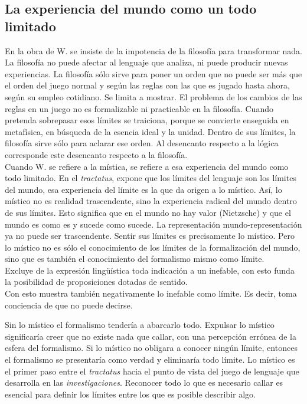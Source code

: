 \documentclass[a4paper, 11pt, twocolumn, spanish]{article}
\begin{document}
\subsection{La experiencia del mundo como un todo limitado}
\label{sec:orgdf86a2f}
En la obra de W. se insiste de la impotencia de la filosofía para
transformar nada. La filosofía no puede afectar al lenguaje que
analiza, ni puede producir nuevas experiencias. La filosofía sólo
sirve para poner un orden que no puede ser más que el orden del juego
normal y según las reglas con las que es jugado hasta ahora, según su
empleo cotidiano. Se limita a mostrar. El problema de los cambios de
las reglas en un juego no es formalizable ni practicable en la
filosofía. Cuando pretenda sobrepasar esos límites se traiciona,
porque se convierte enseguida en metafísica, en búsqueda de la esencia
ideal y la unidad. Dentro de sus límites, la filosofía sirve sólo para
aclarar ese orden. Al desencanto respecto a la lógica corresponde este
desencanto respecto a la filosofía.\\

Cuando W. se refiere a la mística, se refiere a esa experiencia del
mundo como todo limitado. En el \emph{tractatus}, expone que los límites
del lenguaje son los límites del mundo, esa experiencia del límite es
la que da origen a lo místico. Así, lo místico no es realidad
trascendente, sino la experiencia radical del mundo dentro de sus
límites. Esto significa que en el mundo no hay valor (Nietzsche) y que
el mundo es como es y sucede como sucede. La representación
mundo-representación ya no puede ser trascendente. Sentir sus límites
es precisamente lo místico. Pero lo místico no es sólo el conocimiento
de los límites de la formalización del mundo, sino que es también el
conocimiento del formalismo mismo como límite.\\
Excluye de la expresión lingüística toda indicación a un inefable, con
esto funda la posibilidad de proposiciones dotadas de sentido.\\
Con esto muestra también negativamente lo inefable como límite. Es
decir, toma conciencia de que no puede decirse.

Sin lo místico el formalismo tendería a abarcarlo todo. Expulsar lo
místico significaría creer que no existe nada que callar, con una
percepción errónea de la esfera del formalismo. Si lo místico no
obligara a conocer ningún límite, entonces el formalismo se
presentaría como verdad y eliminaría todo límite. Lo místico es el
primer paso entre el \emph{tractatus} hacia el punto de vista del juego de
lenguaje que desarrolla en las \emph{investigaciones}. Reconocer todo lo
que es necesario callar es esencial para definir los límites entre los
que es posible describir algo.
\end{document}

